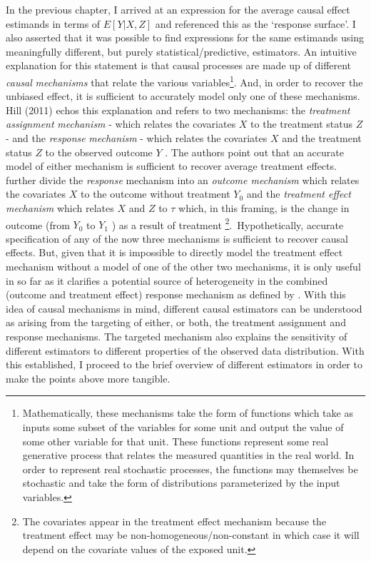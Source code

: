 \documentclass[../main.tex]{subfiles}
\begin{document}
\vspace{\baselineskip}
In the previous chapter, I arrived at an expression for the average causal effect estimands in terms of  \( E \left[ Y  \vert  X, Z \right]  \)  and referenced this as the ‘response surface’. I also asserted that it was possible to find expressions for the same estimands using meaningfully different, but purely statistical/predictive, estimators. An intuitive explanation for this statement is that causal processes are made up of different \textit{causal} \textit{mechanisms} that relate the various variables\footnote{ Mathematically, these mechanisms take the form of functions which take as inputs some subset of the variables for some unit and output the value of some other variable for that unit. These functions represent some real generative process that relates the measured quantities in the real world. In order to represent real stochastic processes, the functions may themselves be stochastic and take the form of distributions parameterized by the input variables. }. And, in order to recover the unbiased effect, it is sufficient to accurately model only one of these mechanisms. Hill (2011) echos this explanation and refers to two mechanisms: the \textit{treatment assignment} \textit{mechanism} - which relates the covariates  \( X \) to the treatment status  \( Z \)  - and the \textit{response} \textit{mechanism} - which relates the covariates  \( X \)  and the treatment status  \( Z \)  to the observed outcome  \( Y \) . The authors point out that an accurate model of either mechanism is sufficient to recover average treatment effects. \textcite{Kunzel2019MetalearnersLearning} further divide the \textit{response} mechanism into an \textit{outcome mechanism} which relates the covariates  \( X \) to the outcome without treatment  \( Y_{0} \) and the \textit{treatment effect mechanism} which relates  \( X \) and  \( Z \) to  \(  \tau \) which, in this framing, is the change in outcome (from  \( Y_{0} \) to  \( Y_{1} \) ) as a result of treatment \footnote{ The covariates appear in the treatment effect mechanism because the treatment effect may be non-homogeneous/non-constant in which case it will depend on the covariate values of the exposed unit. }.\  Hypothetically, accurate specification of any of the now three mechanisms is sufficient to recover causal effects. But, given that it is impossible to directly model the treatment effect mechanism without a model of one of the other two mechanisms, it is only useful in so far as it clarifies a potential source of heterogeneity in the combined (outcome and treatment effect) response mechanism as defined by \textcite{Hill2011BayesianInference}. With this idea of causal mechanisms in mind, different causal estimators can be understood as arising from the targeting of either, or both, the treatment assignment and response mechanisms. The targeted mechanism also explains the sensitivity of different estimators to different properties of the observed data distribution. With this established, I proceed to the brief overview of different estimators in order to make the points above more tangible.\par
\end{document}
